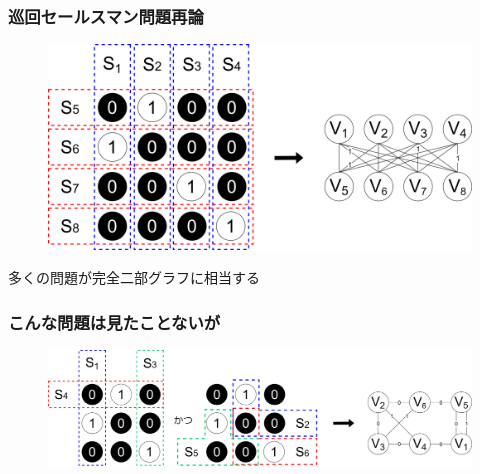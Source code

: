 \begin{frame}
  \frametitle{巡回セールスマン問題再論}
  \begin{figure}
      \includegraphics[width=0.85\linewidth]{data/kanzen2ji_to_graph}
  \end{figure}
  \centering
  多くの問題が完全二部グラフに相当する
\end{frame}

\begin{frame}
  \frametitle{こんな問題は見たことないが}
  \begin{figure}
      \includegraphics[width=1\linewidth]{data/2ji_to_graph}
  \end{figure}
\end{frame}

